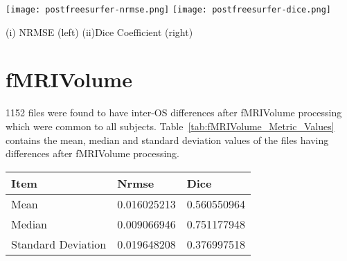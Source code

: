 \begin{center}
\texttt{[image: postfreesurfer-nrmse.png]}%
\texttt{[image: postfreesurfer-dice.png]}
\caption*{(i) NRMSE (left) (ii)Dice Coefficient (right)}
\label{fig:postfreesurfer_metric_values}
\end{center}

\section{fMRIVolume}\label{sec:fMRI}
1152 files were found to have inter-OS differences after fMRIVolume processing which were common to all subjects. Table~\ref{tab:fMRIVolume_Metric_Values} contains the mean, median and standard deviation values of the files having differences after fMRIVolume processing.
\hfill \break
\begin{center}
\begin{tabular}{|l|l|l|}
\hline
\textbf{Item}      & \textbf{Nrmse}  & \textbf{Dice} \\ \hline
Mean               & 0.016025213     & 0.560550964   \\ \hline
Median             & 0.009066946     & 0.751177948   \\ \hline
Standard Deviation & 0.019648208     & 0.376997518   \\ \hline
\end{tabular}
\label{tab:fMRIVolume_Metric_Values}
\end{center}
\hfill \break

